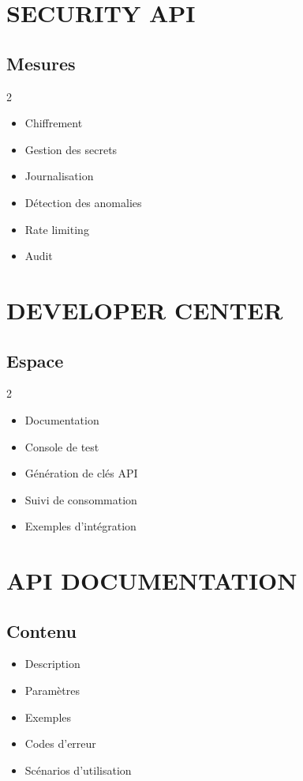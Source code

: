 \documentclass[12pt,a4paper,oneside]{book}
\begin{document}
\chapter{SECURITY API}

\section{Mesures}
\begin{multicols}{2}
\begin{itemize}
\item Chiffrement
\item Gestion des secrets
\item Journalisation
\item Détection des anomalies
\item Rate limiting
\item Audit
\end{itemize}
\end{multicols}

\chapter{DEVELOPER CENTER}

\section{Espace}
\begin{multicols}{2}
\begin{itemize}
\item Documentation
\item Console de test
\item Génération de clés API
\item Suivi de consommation
\item Exemples d'intégration
\end{itemize}
\end{multicols}

\chapter{API DOCUMENTATION}

\section{Contenu}
\begin{itemize}
\item Description
\item Paramètres
\item Exemples
\item Codes d'erreur
\item Scénarios d'utilisation
\end{itemize}
\end{document}
